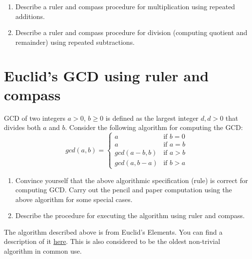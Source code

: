 \begin{exercise}
\begin{enumerate}
\item Describe a ruler and compass procedure for multiplication using repeated additions.
\item Describe a ruler and compass procedure for division (computing quotient and remainder) using repeated subtractions.
\end{enumerate}
\end{exercise}



\section{Euclid's GCD using ruler and compass}
\label{sec:gcd}
GCD of two integers $a > 0$, $b \geq 0$ is defined as the largest integer $d, d > 0$ that divides both $a$ and $b$. Consider the following algorithm for computing the GCD:
        \[
                gcd(a,b)
                 = \left\{      \begin{array}{ll}
                                a       &                     \mbox{if $b = 0$} \\
                                a       &                     \mbox{if $a = b$} \\
                                gcd(a-b,b)      &       \mbox{if $a > b$} \\
                                gcd(a,b-a)      &       \mbox{if $b > a$}
                                \end{array}
                        \right.
        \]
\begin{exercise}
\begin{enumerate}
\item        Convince yourself that the above algorithmic specification (rule) is correct for computing GCD. Carry out the pencil and paper computation using the  above algorithm for some  special cases.
\item         Describe the procedure for executing the algorithm using ruler and compass.
\end{enumerate}
\end{exercise}

The algorithm described above is from Euclid's Elements. You can find a description of it \href{https://en.wikipedia.org/wiki/Euclidean_algorithm}{here}. This is also considered to be the oldest non-trivial algorithm in common use.

